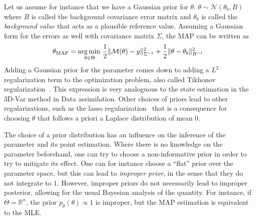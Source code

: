 \documentclass[../../Main_ManuscritThese.tex]{subfiles}
\begin{document}
Let us assume for instance that we have a Gaussian prior for $\theta$:
$\theta \sim \mathcal{N}(\theta_{b},B)$ where $B$ is called the
background covariance error matrix and $\theta_b$ is called the
\emph{background value} that acts as a plausible reference
value. Assuming a Gaussian form for the errors as well with covariance
matrix $\Sigma$, the MAP can be written as
\begin{equation}
  {\theta}_{\mathrm{MAP}} = \operatorname*{arg\,min \,}_{\theta \in \Theta} \frac{1}{2}\| \mathcal{M}(\theta) - y\|^2_{\Sigma^{-1}} + \frac{1}{2}\|\theta - \theta_b\|^2_{B^{-1}}
\end{equation}
Adding a Gaussian prior for the parameter comes down to adding a $L^2$
regularization term to the optimization problem, also called Tikhonov
regularization~\cite{tikhonov_solutions_1977}. This expression is very
analoguous to the state estimation in the 3D-Var method in Data
assimilation.  Other choices of priors lead to other regularizations,
such as the lasso regularization~\cite{tibshirani_regression_2011}
that is a consequence for choosing $\theta$ that follows a priori a
Laplace distribution of mean $0$.

The choice of a prior distribution has an influence on the inference
of the parameter and its point estimation. Where there is no knowledge
on the parameter beforehand, one can try to choose a non-informative
prior in order to try to mitigate its effect. One can for instance
choose a ``flat'' prior over the parameter space, but this can lead to
\emph{improper prior}, in the sense that they do not integrate to
$1$. However, improper priors do not necessarily lead to improper
posterior, allowing for the usual Bayesian analysis of the
quantity. For instance, if $\Theta=\mathbb{R}^n$, the prior
$p_{\theta}(\theta) \propto 1$ is improper, but the MAP estimation is
equivalent to the MLE.

\end{document}
